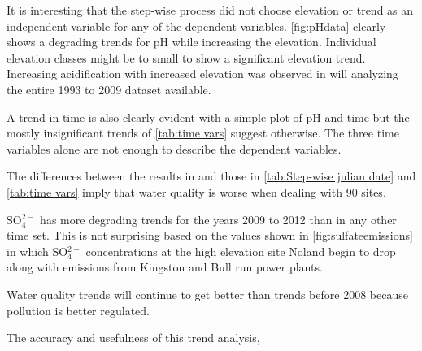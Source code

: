 It is interesting that the step-wise process did not choose elevation or trend as an independent variable for any of the dependent variables. \autoref{fig:pHdata} clearly shows a degrading trends for pH while increasing the elevation. Individual elevation classes might be to small to show a significant elevation trend.  Increasing acidification with increased elevation was observed in \citet{cai2012} will analyzing the entire 1993 to 2009 dataset available.

A trend in time is also clearly evident with a simple plot of pH and time but the mostly insignificant trends of \autoref{tab:time vars} suggest otherwise. The three time variables alone are not enough to describe the dependent variables.

The differences between the results in \citet{robinson2008ph} and those in \autoref{tab:Step-wise julian date} and \autoref{tab:time vars} imply that water quality is worse when dealing with 90 sites.%

SO$_4^{2-}$ has more degrading trends for the years 2009 to 2012 than in any other time set. This is not surprising based on the values shown in \autoref{fig:sulfateemissions} in which SO$_4^{2-}$ concentrations at the high elevation site Noland begin to drop along with emissions from Kingston and Bull run power plants.

Water quality trends will continue to get better than trends before 2008 because pollution is better regulated.%

The accuracy and usefulness of this trend analysis, %
	
